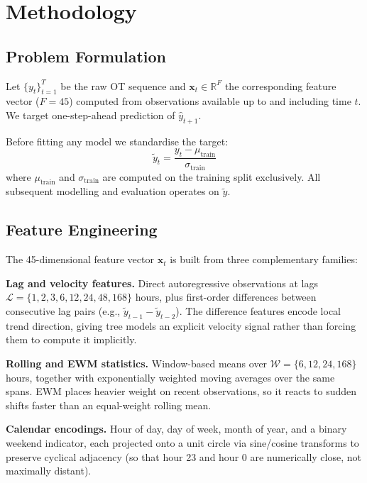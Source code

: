 \documentclass[conference]{IEEEtran}
\begin{document}
  \section{Methodology}

  \subsection{Problem Formulation}

  Let $\{y_{t}\}_{t=1}^{T}$ be the raw OT sequence and
  $\mathbf{x}_{t} \in \mathbb{R}^{F}$ the corresponding feature vector ($F = 45$)
  computed from observations available up to and including time $t$. We target
  one-step-ahead prediction of $\hat{y}_{t+1}$.

  Before fitting any model we standardise the target:
  \begin{equation}
    \tilde{y}_{t} = \frac{y_{t} - \mu_{\text{train}}}{\sigma_{\text{train}}}
  \end{equation}
  where $\mu_{\text{train}}$ and $\sigma_{\text{train}}$ are computed on the training
  split exclusively. All subsequent modelling and evaluation operates on $\tilde{y}$.

  \subsection{Feature Engineering}

  The 45-dimensional feature vector $\mathbf{x}_{t}$ is built from three complementary
  families:

  \textbf{Lag and velocity features.} Direct autoregressive observations at lags
  $\mathcal{L}= \{1, 2, 3, 6, 12, 24, 48, 168\}$ hours, plus first-order differences
  between consecutive lag pairs (e.g., $\tilde{y}_{t-1} - \tilde{y}_{t-2}$). The
  difference features encode local trend direction, giving tree models an explicit
  velocity signal rather than forcing them to compute it implicitly.

  \textbf{Rolling and EWM statistics.} Window-based means over
  $\mathcal{W}= \{6, 12, 24, 168\}$ hours, together with exponentially weighted
  moving averages over the same spans. EWM places heavier weight on recent observations,
  so it reacts to sudden shifts faster than an equal-weight rolling mean.

  \textbf{Calendar encodings.} Hour of day, day of week, month of year, and a
  binary weekend indicator, each projected onto a unit circle via sine/cosine
  transforms to preserve cyclical adjacency (so that hour 23 and hour 0 are
  numerically close, not maximally distant).
\end{document}
